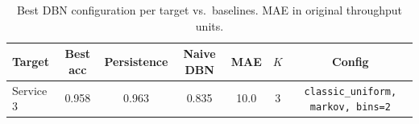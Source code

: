 \begin{table}[t]
\centering
\caption{Best DBN configuration per target vs.\ baselines. MAE in original throughput units.}
\label{tab:results}
\begin{tabular}{lcccccc}
\toprule
Target & Best acc & Persistence & Naive DBN & MAE & $K$ & Config \\
\midrule
Service 3 & 0.958 & 0.963 & 0.835 & 10.0 & 3 & \texttt{classic_uniform, markov, bins=2} \\
\bottomrule
\end{tabular}
\end{table}
